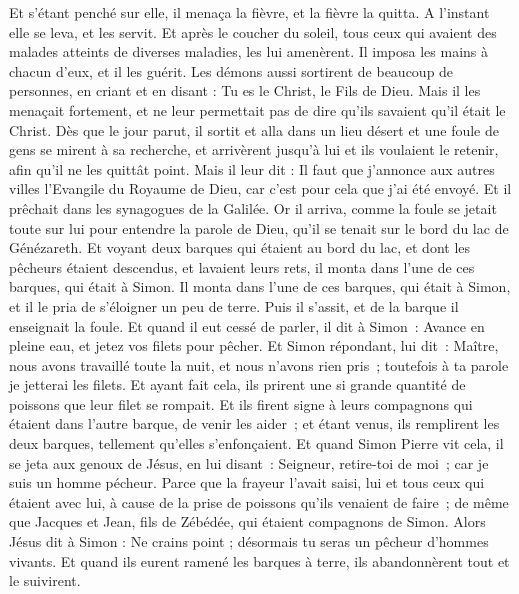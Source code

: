 \begin{multicols}{2}
Et s'étant penché sur elle, il menaça la fièvre, et la fièvre la quitta. A l'instant elle se leva, et les servit.
Et après le coucher du soleil, tous ceux qui avaient des malades atteints de diverses maladies, les lui amenèrent. Il imposa les mains à chacun d'eux, et il les guérit.
Les démons aussi sortirent de beaucoup de personnes, en criant et en disant : Tu es le Christ, le Fils de Dieu. Mais il les menaçait fortement, et ne leur permettait pas de dire qu'ils savaient qu'il était le Christ.
Dès que le jour parut, il sortit et alla dans un lieu désert et une foule de gens se mirent à sa recherche, et arrivèrent jusqu'à lui et ils voulaient le retenir, afin qu'il ne les quittât point.
Mais il leur dit : Il faut que j'annonce aux autres villes l'Evangile du Royaume de Dieu, car c'est pour cela que j'ai été envoyé.
Et il prêchait dans les synagogues de la Galilée.
\VerseOne{}Or il arriva, comme la foule se jetait toute sur lui pour entendre la parole de Dieu, qu’il se tenait sur le bord du lac de Génézareth.
Et voyant deux barques qui étaient au bord du lac, et dont les pêcheurs étaient descendus, et lavaient leurs rets, il monta dans l’une de ces barques, qui était à Simon.
Il monta dans l'une de ces barques, qui était à Simon, et il le pria de s'éloigner un peu de terre. Puis il s'assit, et de la barque il enseignait la foule.
Et quand il eut cessé de parler, il dit à Simon : Avance en pleine eau, et jetez vos filets pour pêcher.
Et Simon répondant, lui dit : Maître, nous avons travaillé toute la nuit, et nous n’avons rien pris ; toutefois à ta parole je jetterai les filets.
Et ayant fait cela, ils prirent une si grande quantité de poissons que leur filet se rompait.
Et ils firent signe à leurs compagnons qui étaient dans l’autre barque, de venir les aider ; et étant venus, ils remplirent les deux barques, tellement qu’elles s’enfonçaient.
Et quand Simon Pierre vit cela, il se jeta aux genoux de Jésus, en lui disant : Seigneur, retire-toi de moi ; car je suis un homme pécheur.
Parce que la frayeur l’avait saisi, lui et tous ceux qui étaient avec lui, à cause de la prise de poissons qu’ils venaient de faire ; de même que Jacques et Jean, fils de Zébédée, qui étaient compagnons de Simon.
Alors Jésus dit à Simon : Ne crains point ; désormais tu seras un pêcheur d'hommes vivants.
Et quand ils eurent ramené les barques à terre, ils abandonnèrent tout et le suivirent.

\end{multicols}
